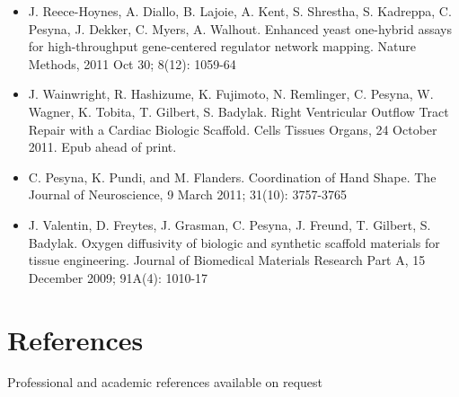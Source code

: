 \documentclass[margin,line]{resume}
\begin{document}
\begin{resume}
    \begin{itemize}
    \item J. Reece-Hoynes, A. Diallo, B. Lajoie, A. Kent, S. Shrestha, S. Kadreppa, C. Pesyna, J. Dekker, C. Myers, A. Walhout. Enhanced yeast one-hybrid assays for high-throughput gene-centered regulator network mapping. Nature Methods, 2011 Oct 30; 8(12): 1059-64
    \item J. Wainwright, R. Hashizume, K. Fujimoto, N. Remlinger, C. Pesyna, W. Wagner, K. Tobita, T. Gilbert, S. Badylak. Right Ventricular Outflow Tract Repair with a Cardiac Biologic Scaffold. Cells Tissues Organs, 24 October 2011. Epub ahead of print.
    \item C. Pesyna, K. Pundi, and M. Flanders. Coordination of Hand Shape. The Journal of Neuroscience, 9 March 2011; 31(10): 3757-3765
    \item J. Valentin, D. Freytes, J. Grasman, C. Pesyna, J. Freund, T. Gilbert, S. Badylak. Oxygen diffusivity of biologic and synthetic scaffold materials for tissue engineering. Journal of Biomedical Materials Research Part A, 15 December 2009; 91A(4): 1010-17
    \end{itemize}

    \section{\mysidestyle References} 
    {Professional and academic references available on request}

\end{resume}
\end{document}
